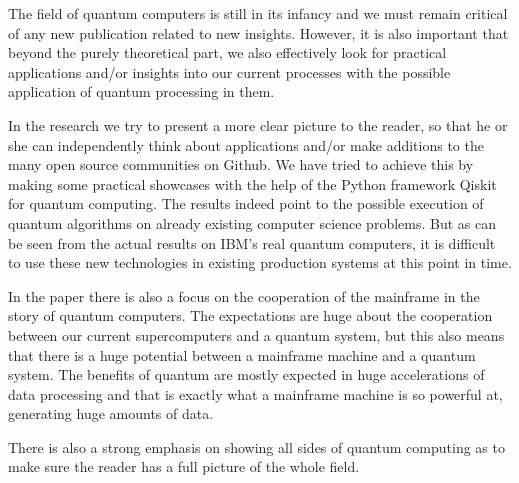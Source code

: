 The field of quantum computers is still in its infancy and we must remain critical of any new publication related to new insights. However, it is also important that beyond the purely theoretical part, we also effectively look for practical applications and/or insights into our current processes with the possible application of quantum processing in them. 

In the research we try to present a more clear picture to the reader, so that he or she can independently think about applications and/or make additions to the many open source communities on Github. We have tried to achieve this by making some practical showcases with the help of the Python framework Qiskit for quantum computing. The results indeed point to the possible execution of quantum algorithms on already existing computer science problems. But as can be seen from the actual results on IBM's real quantum computers, it is difficult to use these new technologies in existing production systems at this point in time. 

In the paper there is also a focus on the cooperation of the mainframe in the story of quantum computers. The expectations are huge about the cooperation between our current supercomputers and a quantum system, but this also means that there is a huge potential between a mainframe machine and a quantum system. The benefits of quantum are mostly expected in huge accelerations of data processing and that is exactly what a mainframe machine is so powerful at, generating huge amounts of data.

There is also a strong emphasis on showing all sides of quantum computing as to make sure the reader has a full picture of the whole field.

